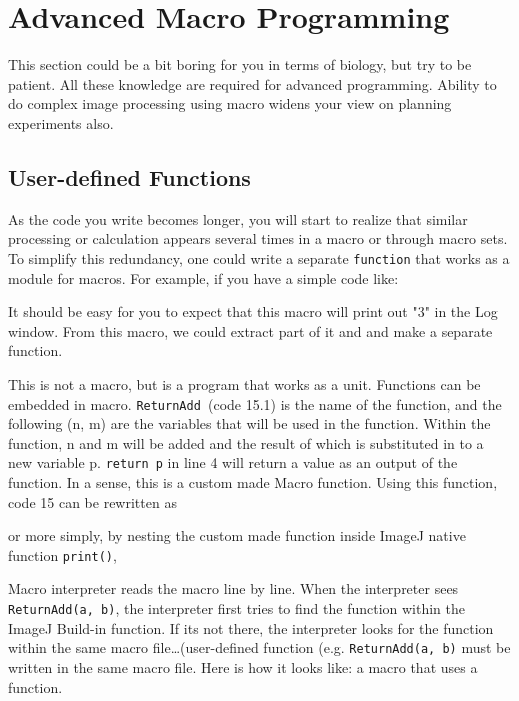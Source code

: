 \documentclass[11pt,a4paper,oneside]{report}
\newcommand{\ilcom}[1]{\texttt{\small#1}}
\begin{document}
\newpage

\section{Advanced Macro Programming}
This section could be a bit boring for you in terms of biology, but try to be patient. All these knowledge are required for advanced programming. Ability to do complex image processing using macro widens your view on planning experiments also.

\subsection{User-defined Functions}
As the code you write becomes longer, you will start to realize that similar processing or calculation appears several times in a macro or through macro sets. To simplify this redundancy, one could write a separate \ilcom{function} that works as a module for macros. 
For example, if you have a simple code like:

It should be easy for you to expect that this macro will print out "3" in the Log window. From this macro, we could extract part of it and and make a separate function. 

This is not a macro, but is a program that works as a unit. Functions can be embedded in macro. \ilcom{ReturnAdd }(code 15.1) is the name of the function, and the following (n, m) are the variables that will be used in the function. Within the function, n and m will be added and the result of which is substituted in to a new variable p. \ilcom{return p} in line 4 will return a value as an output of the function. In a sense, this is a custom made Macro function. Using this function, code 15 can be rewritten as

or more simply, by nesting the custom made function inside ImageJ native function \ilcom{print()},

Macro interpreter reads the macro line by line. When the interpreter sees \ilcom{ReturnAdd(a, b)}, the interpreter first tries to find the function within the ImageJ Build-in function. If its not there, the interpreter looks for the function within the same macro file\ldots (user-defined function (e.g. \ilcom{ReturnAdd(a, b)} must be written in the same macro file. Here is how it looks like: a macro that uses a function. 
\end{document}
